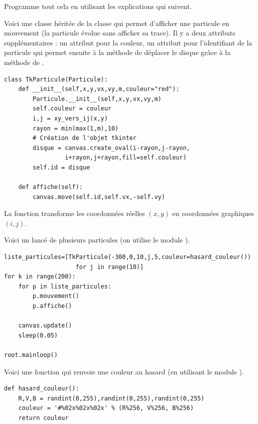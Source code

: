 \documentclass[11pt,class=report,crop=false]{standalone}
\begin{document}
\begin{activite}
Programme tout cela en utilisant les explications qui suivent.

\bigskip

Voici une classe  héritée de la classe  qui
permet d'afficher une particule en mouvement (la particule évolue sans afficher sa trace). 
Il y a deux attributs supplémentaires :
un attribut pour la couleur, un attribut pour l'identifiant  de la particule qui permet ensuite à la méthode  de déplacer le disque grâce à la méthode  de .

\begin{lstlisting}
class TkParticule(Particule):
    def __init__(self,x,y,vx,vy,m,couleur="red"):
        Particule.__init__(self,x,y,vx,vy,m)
        self.couleur = couleur
        i,j = xy_vers_ij(x,y)
        rayon = min(max(1,m),10)
        # Création de l'objet tkinter
        disque = canvas.create_oval(i-rayon,j-rayon,
                 i+rayon,j+rayon,fill=self.couleur)
        self.id = disque

    def affiche(self):
        canvas.move(self.id,self.vx,-self.vy)
\end{lstlisting}

La fonction  transforme les coordonnées réelles $(x,y)$ en coordonnées graphiques $(i,j)$.


Voici un lancé de plusieurs particules (on utilise le module ).
\begin{lstlisting}
liste_particules=[TkParticule(-300,0,10,j,5,couleur=hasard_couleur()) 
                    for j in range(10)]
for k in range(200):
    for p in liste_particules:
        p.mouvement()
        p.affiche()

    canvas.update()
    sleep(0.05)

root.mainloop()
\end{lstlisting}


Voici une fonction qui renvoie une couleur au hasard (en utilisant le module ).
\begin{lstlisting}
def hasard_couleur():
    R,V,B = randint(0,255),randint(0,255),randint(0,255)
    couleur = '#%02x%02x%02x' % (R%256, V%256, B%256)
    return couleur
\end{lstlisting}



\end{activite}
\end{document}
